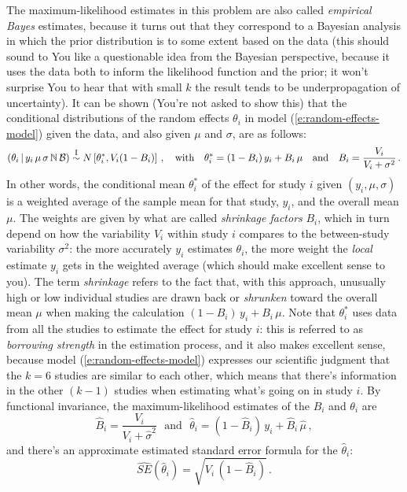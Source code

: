 \documentclass[12pt]{article}
\newcommand{\given}{\, | \,}
\begin{document}
The maximum-likelihood estimates in this problem are also called \textit{empirical Bayes} estimates, because it turns out that they correspond to a Bayesian analysis in which the prior distribution is to some extent based on the data (this should sound to You like a questionable idea from the Bayesian perspective, because it uses the data both to inform the likelihood function and the prior; it won't surprise You to hear that with small $k$ the result tends to be underpropagation of uncertainty). It can be shown (You're not asked to show this) that the conditional distributions of the random effects $\theta_i$ in model (\ref{e:random-effects-model}) given the data, and also given $\mu$ and $\sigma$, are as follows:
\begin{equation} \label{e:shrinkage-1}
( \theta_i \given y_i \, \mu \, \sigma \, \mathbb{ N } \, \mathcal{ B } ) \stackrel{ \textrm{\footnotesize I} }{ \sim } N \left[ \theta_i^*, V_i ( 1 - B_i ) \right] \, , \ \ \ \textrm{with} \ \ \ \theta_i^* = ( 1 - B_i ) \, y_i + B_i \, \mu \ \ \ \textrm{and} \ \ \ B_i = \frac{ V_i }{ V_i + \sigma^2 } \, .
\end{equation}
In other words, the conditional mean $\theta_i^*$ of the effect for study $i$ given $( y_i,  \mu, \sigma )$ is a weighted average of the sample mean for that study, $y_i$, and the overall mean $\mu$. The weights are given by what are called \textit{shrinkage factors} $B_i$, which in turn depend on how the variability $V_i$ within study $i$ compares to the between-study variability $\sigma^2$: the more accurately $y_i$ estimates $\theta_i$, the more weight the \textit{local} estimate $y_i$ gets in the weighted average (which should make excellent sense to you). The term \textit{shrinkage} refers to the fact that, with this approach, unusually high or low individual studies are drawn back or \textit{shrunken} toward the overall mean $\mu$ when making the calculation $( 1 - B_i ) \, y_i + B_i \, \mu$. Note that $\theta_i^*$ uses data from all the studies to estimate the effect for study $i$: this is referred to as \textit{borrowing strength} in the estimation process, and it also makes excellent sense, because model (\ref{e:random-effects-model}) expresses our scientific judgment that the $k = 6$ studies are similar to each other, which means that there's information in the other $( k - 1 )$ studies when estimating what's going on in study $i$. By functional invariance, the maximum-likelihood estimates of the $B_i$ and $\theta_i$ are
\begin{equation} \label{e:shrinkage-2}
\hat{ B }_i = \frac{ V_i }{ V_i + \hat{ \sigma }^2 } \ \ \ \textrm{and} \ \ \ \hat{ \theta }_i = ( 1 - \hat{ B }_i ) \, y_i + \hat{ B }_i \, \hat{ \mu } \, ,
\end{equation}
and there's an approximate estimated standard error formula for the $\hat{ \theta }_i$:
\begin{equation} \label{e:shrinkage-3}
\widehat{ SE } \left( \hat{ \theta }_i \right) = \sqrt{ V_i \, ( 1 - \hat{ B }_i ) } \, .
\end{equation}
\end{document}
